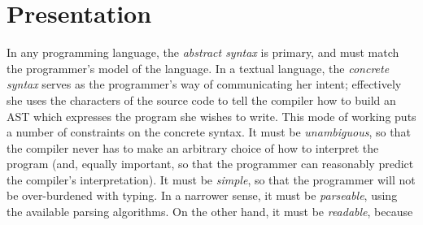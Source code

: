 \section{Presentation}
In any programming language, the \emph{abstract syntax} is primary, and must match the programmer's model of the language. In a textual language, the \emph{concrete syntax} serves as the programmer's way of communicating her intent; effectively she uses the characters of the source code to tell the compiler how to build an AST which expresses the program she wishes to write. This mode of working puts a number of constraints on the concrete syntax. It must be \emph{unambiguous}, so that the compiler never has to make an arbitrary choice of how to interpret the program (and, equally important, so that the programmer can reasonably predict the compiler's interpretation). It must be \emph{simple}, so that the programmer will not be over-burdened with typing. In a narrower sense, it must be \emph{parseable}, using the available parsing algorithms. On the other hand, it must be \emph{readable}, because 





